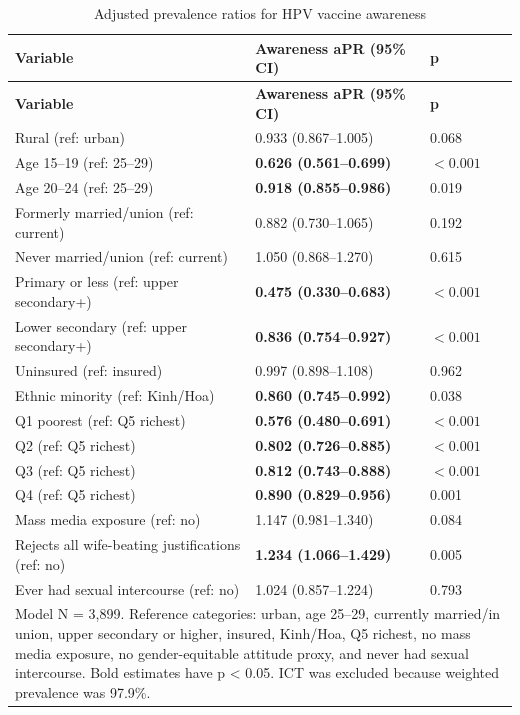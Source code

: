 \begin{longtable}{|p{6.2cm}|p{3.6cm}|p{1.3cm}|}
\caption{Adjusted prevalence ratios for HPV vaccine awareness}
\label{tab:adjusted_awareness}\\
\hline
\textbf{Variable} & \textbf{Awareness aPR (95\% CI)} & \textbf{p} \\
\hline
\endfirsthead
\hline
\textbf{Variable} & \textbf{Awareness aPR (95\% CI)} & \textbf{p} \\
\hline
\endhead
Rural (ref: urban) & 0.933 (0.867--1.005) & 0.068 \\
Age 15--19 (ref: 25--29) & \textbf{0.626 (0.561--0.699)} & $<0.001$ \\
Age 20--24 (ref: 25--29) & \textbf{0.918 (0.855--0.986)} & 0.019 \\
Formerly married/union (ref: current) & 0.882 (0.730--1.065) & 0.192 \\
Never married/union (ref: current) & 1.050 (0.868--1.270) & 0.615 \\
Primary or less (ref: upper secondary+) & \textbf{0.475 (0.330--0.683)} & $<0.001$ \\
Lower secondary (ref: upper secondary+) & \textbf{0.836 (0.754--0.927)} & $<0.001$ \\
Uninsured (ref: insured) & 0.997 (0.898--1.108) & 0.962 \\
Ethnic minority (ref: Kinh/Hoa) & \textbf{0.860 (0.745--0.992)} & 0.038 \\
Q1 poorest (ref: Q5 richest) & \textbf{0.576 (0.480--0.691)} & $<0.001$ \\
Q2 (ref: Q5 richest) & \textbf{0.802 (0.726--0.885)} & $<0.001$ \\
Q3 (ref: Q5 richest) & \textbf{0.812 (0.743--0.888)} & $<0.001$ \\
Q4 (ref: Q5 richest) & \textbf{0.890 (0.829--0.956)} & 0.001 \\
Mass media exposure (ref: no) & 1.147 (0.981--1.340) & 0.084 \\
Rejects all wife-beating justifications (ref: no) & \textbf{1.234 (1.066--1.429)} & 0.005 \\
Ever had sexual intercourse (ref: no) & 1.024 (0.857--1.224) & 0.793 \\
\hline
\multicolumn{3}{|p{11.6cm}|}{\footnotesize Model N = 3,899. Reference categories: urban, age 25--29, currently married/in union, upper secondary or higher, insured, Kinh/Hoa, Q5 richest, no mass media exposure, no gender-equitable attitude proxy, and never had sexual intercourse. Bold estimates have p < 0.05. ICT was excluded because weighted prevalence was 97.9\%.} \\
\hline
\end{longtable}

